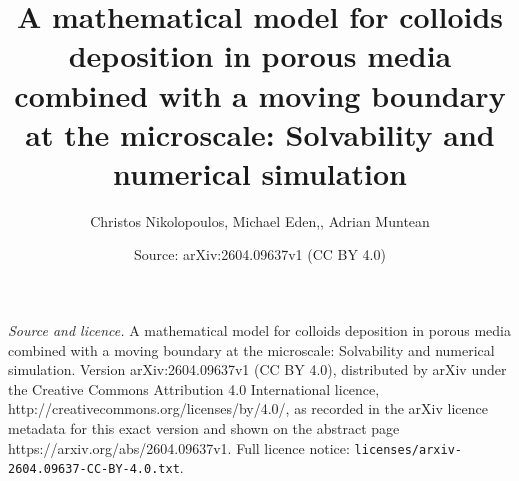 \documentclass[10pt,a4paper]{amsart}
\title{A mathematical model for colloids deposition in porous media combined with a moving boundary at the microscale: Solvability and numerical simulation}
\author{Christos Nikolopoulos, Michael Eden,, Adrian Muntean}
\date{Source: arXiv:2604.09637v1 (CC BY 4.0)}
\begin{document}
\maketitle

\noindent\emph{Source and licence.} A mathematical model for colloids deposition in porous media combined with a moving boundary at the microscale: Solvability and numerical simulation. Version arXiv:2604.09637v1 (CC BY 4.0), distributed by arXiv under the Creative Commons Attribution 4.0 International licence, http://creativecommons.org/licenses/by/4.0/, as recorded in the arXiv licence metadata for this exact version and shown on the abstract page https://arxiv.org/abs/2604.09637v1. Full licence notice: \texttt{licenses/arxiv-2604.09637-CC-BY-4.0.txt}.\par\smallskip
\end{document}

